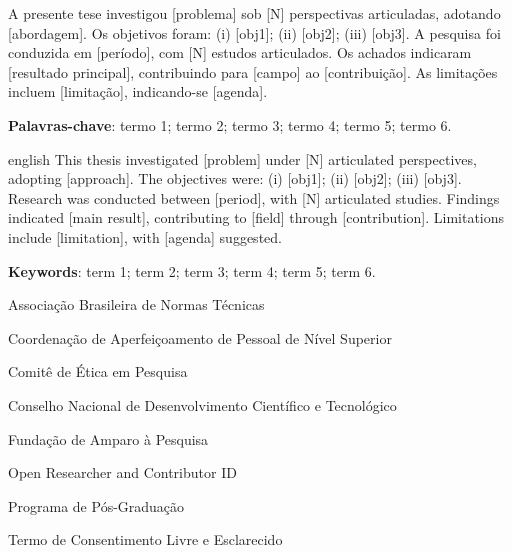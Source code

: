 \documentclass[
    12pt,
    openright,
    twoside,
    a4paper,
    chapter=TITLE,
    sumario=tradicional,
    section=TITLE,
    english,
    brazil
]{abntex2}
\begin{document}
\setlength{\absparsep}{18pt}
\begin{resumo}
\noindent A presente tese investigou [problema] sob [N]
perspectivas articuladas, adotando [abordagem]. Os objetivos
foram: (i) [obj1]; (ii) [obj2]; (iii) [obj3]. A pesquisa foi
conduzida em [período], com [N] estudos articulados. Os achados
indicaram [resultado principal], contribuindo para [campo] ao
[contribuição]. As limitações incluem [limitação], indicando-se
[agenda].

\noindent\textbf{Palavras-chave}: termo 1; termo 2; termo 3;
termo 4; termo 5; termo 6.
\end{resumo}

\begin{resumo}[Abstract]\begin{otherlanguage*}{english}
\noindent This thesis investigated [problem] under [N] articulated
perspectives, adopting [approach]. The objectives were: (i) [obj1];
(ii) [obj2]; (iii) [obj3]. Research was conducted between [period],
with [N] articulated studies. Findings indicated [main result],
contributing to [field] through [contribution]. Limitations include
[limitation], with [agenda] suggested.

\noindent\textbf{Keywords}: term 1; term 2; term 3; term 4; term 5;
term 6.
\end{otherlanguage*}\end{resumo}

\listoffigures*\cleardoublepage
{}
\listoftables*\cleardoublepage

\begin{siglas}
\item[ABNT] Associação Brasileira de Normas Técnicas
\item[CAPES] Coordenação de Aperfeiçoamento de Pessoal de Nível Superior
\item[CEP] Comitê de Ética em Pesquisa
\item[CNPq] Conselho Nacional de Desenvolvimento Científico e Tecnológico
\item[FAP] Fundação de Amparo à Pesquisa
\item[ORCID] Open Researcher and Contributor ID
\item[PPG] Programa de Pós-Graduação
\item[TCLE] Termo de Consentimento Livre e Esclarecido
\end{siglas}

\tableofcontents*\cleardoublepage
\end{document}
